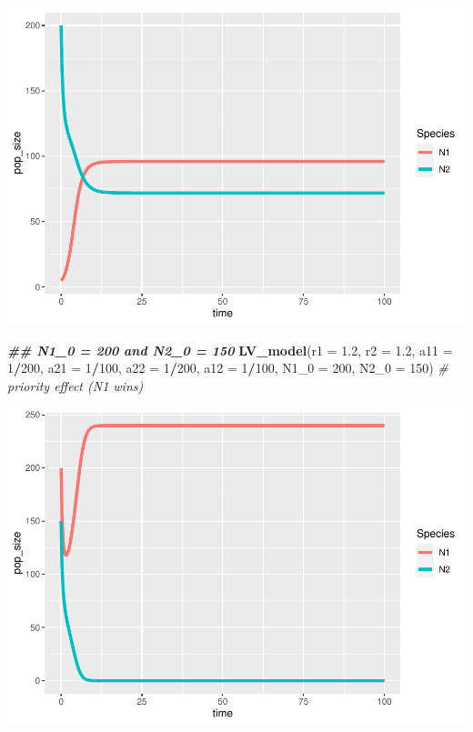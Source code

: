\documentclass[
]{book}
\newenvironment{Shaded}{\begin{snugshade}}{\end{snugshade}}
\newcommand{\AttributeTok}[1]{\textcolor[rgb]{0.13,0.29,0.53}{#1}}
\newcommand{\CommentTok}[1]{\textcolor[rgb]{0.56,0.35,0.01}{\textit{#1}}}
\newcommand{\DecValTok}[1]{\textcolor[rgb]{0.00,0.00,0.81}{#1}}
\newcommand{\DocumentationTok}[1]{\textcolor[rgb]{0.56,0.35,0.01}{\textbf{\textit{#1}}}}
\newcommand{\FloatTok}[1]{\textcolor[rgb]{0.00,0.00,0.81}{#1}}
\newcommand{\FunctionTok}[1]{\textcolor[rgb]{0.13,0.29,0.53}{\textbf{#1}}}
\newcommand{\NormalTok}[1]{#1}
\newcommand{\SpecialCharTok}[1]{\textcolor[rgb]{0.81,0.36,0.00}{\textbf{#1}}}
\begin{document}
\includegraphics{bookdown-demo_files/figure-latex/unnamed-chunk-21-6.pdf}

\begin{Shaded}
\begin{Highlighting}[]
  \DocumentationTok{\#\# N1\_0 = 200 and N2\_0 = 150}
  \FunctionTok{LV\_model}\NormalTok{(}\AttributeTok{r1 =} \FloatTok{1.2}\NormalTok{, }\AttributeTok{r2 =} \FloatTok{1.2}\NormalTok{, }\AttributeTok{a11 =} \DecValTok{1}\SpecialCharTok{/}\DecValTok{200}\NormalTok{, }\AttributeTok{a21 =} \DecValTok{1}\SpecialCharTok{/}\DecValTok{100}\NormalTok{, }\AttributeTok{a22 =} \DecValTok{1}\SpecialCharTok{/}\DecValTok{200}\NormalTok{, }\AttributeTok{a12 =} \DecValTok{1}\SpecialCharTok{/}\DecValTok{100}\NormalTok{, }\AttributeTok{N1\_0 =} \DecValTok{200}\NormalTok{, }\AttributeTok{N2\_0 =} \DecValTok{150}\NormalTok{)  }\CommentTok{\# priority effect (N1 wins)}
\end{Highlighting}
\end{Shaded}

\includegraphics{bookdown-demo_files/figure-latex/unnamed-chunk-21-7.pdf}
\end{document}
